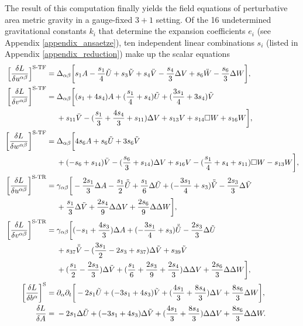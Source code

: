 The result of this computation finally yields the field equations of perturbative area metric gravity in a gauge-fixed $3+1$ setting. Of the 16 undetermined gravitational constants $k_i$ that determine the expansion coefficients $e_i$ (see Appendix \ref{appendix_ansaetze}), ten independent linear combinations $s_i$ (listed in Appendix \ref{appendix_reduction}) make up the scalar equations
\begingroup\allowdisplaybreaks
\begin{align}\footnotesize
  \bigg\lbrack\frac{\delta L}{\delta u^{\alpha\beta}}\bigg\rbrack^\text{S-TF} = {} & \Delta_{\alpha\beta} \bigg\lbrack s_1 A -\frac{s_1}{4} \tilde U + s_3 \tilde V + s_4 \ddot V - \frac{s_4}{3} \Delta V + s_6 \ddot W - \frac{s_6}{3} \Delta W\bigg\rbrack, \nonumber \\
  \bigg\lbrack\frac{\delta L}{\delta v^{\alpha\beta}}\bigg\rbrack^\text{S-TF} = {} & \Delta_{\alpha\beta} \bigg\lbrack (s_1 + 4s_4) A + (\frac{s_1}{4} + s_4) \tilde U + (\frac{3s_1}{4} + 3 s_4) \tilde V \nonumber \\ & + s_{11} \ddot V - (\frac{s_1}{3} + \frac{4s_4}{3} + s_{11}) \Delta V + s_{13} V + s_{14} \Box W + s_{16} W \bigg\rbrack, \nonumber \\
  \bigg\lbrack\frac{\delta L}{\delta w^{\alpha\beta}}\bigg\rbrack^\text{S-TF} = {} & \Delta_{\alpha\beta} \bigg\lbrack 4s_6 A + s_6 \tilde U + 3 s_6 \tilde V \nonumber \\ & + (-s_6 + s_{14}) \ddot V - (\frac{s_6}{3} + s_{14}) \Delta V + s_{16} V - (\frac{s_1}{4} + s_4 + s_{11}) \Box W - s_{13} W \bigg\rbrack, \nonumber \\
  \bigg\lbrack\frac{\delta L}{\delta u^{\alpha\beta}}\bigg\rbrack^\text{S-TR} = {} & \gamma_{\alpha\beta} \bigg\lbrack -\frac{2s_1}{3} \Delta A -\frac{s_1}{2} \ddot{\tilde U} + \frac{s_1}{6} \Delta\tilde U + (-\frac{3s_1}{4} + s_3) \ddot{\tilde V} -\frac{2s_3}{3} \Delta\tilde V \nonumber \\ & + \frac{s_1}{3} \Delta\ddot V + \frac{2s_4}{9} \Delta\Delta V + \frac{2s_6}{9} \Delta\Delta W\bigg\rbrack, \nonumber \\
  \bigg\lbrack\frac{\delta L}{\delta v^{\alpha\beta}}\bigg\rbrack^\text{S-TR} = {} & \gamma_{\alpha\beta} \bigg\lbrack (-s_1 + \frac{4s_3}{3}) \Delta A + (-\frac{3s_1}{4} + s_3) \ddot{\tilde U} - \frac{2s_3}{3} \Delta\tilde U \nonumber \\ & + s_{37} \ddot{\tilde V} - (\frac{3s_1}{2} - 2s_3 + s_{37}) \Delta\tilde V + s_{39} \tilde V \nonumber \\ & + (\frac{s_1}{2} - \frac{2s_3}{3}) \Delta\ddot V + (\frac{s_1}{6} + \frac{2s_3}{9} + \frac{2s_4}{3}) \Delta\Delta V + \frac{2s_6}{3} \Delta\Delta W\bigg\rbrack, \nonumber \\
  \bigg\lbrack\frac{\delta L}{\delta b^{\alpha}}\bigg\rbrack^\text{S} = {} & \partial_\alpha \partial_t \bigg\lbrack -2s_1\tilde U + (-3s_1 + 4s_3) \tilde V + (\frac{4s_1}{3} + \frac{8s_4}{3}) \Delta V + \frac{8s_6}{3} \Delta W\bigg\rbrack, \nonumber \\
  \frac{\delta L}{\delta A} = {} & -2s_1 \Delta\tilde U + (-3s_1 + 4s_3) \Delta\tilde V + (\frac{4s_1}{3} + \frac{8s_4}{3}) \Delta\Delta V + \frac{8s_6}{3} \Delta\Delta W. \label{scalar_equations}
\end{align}%
